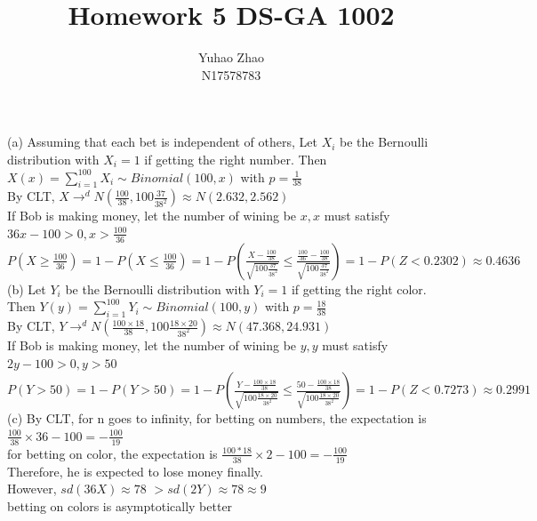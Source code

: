 \documentclass[11pt]{article}
\newenvironment{problem}[2][Problem]{\begin{trivlist}
\item[\hskip \labelsep {\bfseries #1}\hskip \labelsep {\bfseries #2.}]}{\end{trivlist}}
\begin{document}
 
 
\title{Homework 5 DS-GA 1002 }%
\author{Yuhao Zhao\\ %
N17578783} %
 
\maketitle
\begin{problem}{1}
\end{problem}
(a) Assuming that each bet is independent of others, Let $X_i$ be the Bernoulli distribution with $X_i = 1$ if getting the right number. Then $X(x) = \sum_{i  =1}^{100} X_i \sim Binomial(100,x) $ with $p = \frac{1}{38}$\\
By CLT, $X \to^d N(\frac{100}{38}, 100\frac{37}{38^2})\approx N(2.632,2.562)$\\
If Bob is making money, let the number of wining be $x, x$ must satisfy $36x-100>0,x> \frac{100}{36} $\\
$P(X\geq\frac{100}{36}) = 1- P(X\leq\frac{100}{36}) = 1- P(\frac{X - \frac{100}{38}}{\sqrt{ 100\frac{37}{38^2}}} \leq \frac{\frac{100}{36} - \frac{100}{38}}{\sqrt{ 100\frac{37}{38^2}}}) = 1 - P(Z< 0.2302) \approx  0.4636$\\

(b) Let $Y_i$ be the Bernoulli distribution with $Y_i = 1$ if getting the right color. Then $Y(y) = \sum_{i  =1}^{100} Y_i \sim Binomial(100,y) $ with $p = \frac{18}{38}$\\
 By CLT, $Y \to^d N(\frac{100\times 18}{38}, 100\frac{18\times 20}{38^2}) \approx N(47.368, 24.931)$\\
 If Bob is making money, let the number of wining be $y, y$ must satisfy $2y-100>0,y> 50 $\\
$P(Y>50) = 1- P(Y > 50) = 1- P(\frac{Y -\frac{100\times 18}{38} }{\sqrt{ 100\frac{18\times 20}{38^2}}} \leq \frac{50 -\frac{100\times 18}{38}}{\sqrt{ 100\frac{18\times 20}{38^2}}}) = 1 - P(Z< 0.7273) \approx 0.2991$\\

(c) By CLT, for n goes to infinity, for betting on numbers, the expectation  is  $\frac{100}{38} \times 36 - 100 = - \frac{100}{19}$\\
 for betting on color, the expectation  is  $\frac{100*18}{38} \times 2 - 100 = - \frac{100}{19}$\\
 Therefore, he is expected to lose money finally.\\
 However, $sd(36X) \approx 78$ $>sd(2Y)  \approx 78 \approx  9$ \\
betting on colors is asymptotically better\\
\end{document}
